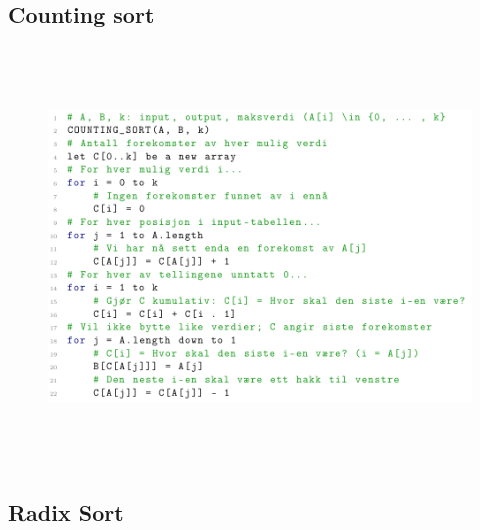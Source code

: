 \documentclass[12pt]{report}
\begin{document}

\par


\vspace{\baselineskip}
\subsection*{Counting sort}



\begin{figure}[H]
	\begin{Center}
		\includegraphics[width=6.3in,height=4.34in]{./media/image174.png}
	\end{Center}
\end{figure}



\par


\vspace{\baselineskip}\subsection*{Radix Sort}


\end{document}
